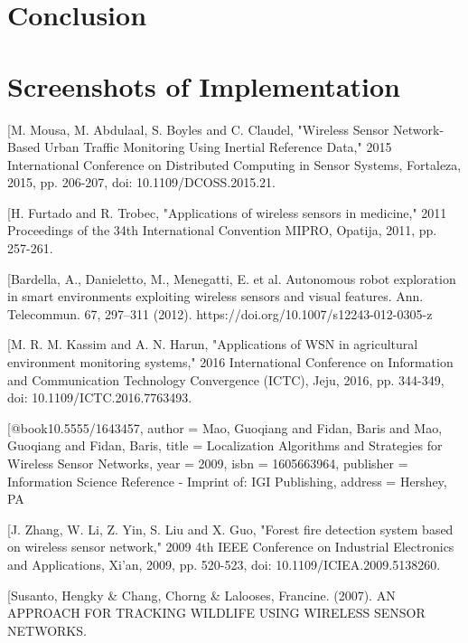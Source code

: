 \documentclass[12pt]{report}
\begin{document}
\chapter{Conclusion}



\appendix
\chapter{Screenshots of Implementation}


\begin{thebibliography}{}

[M. Mousa, M. Abdulaal, S. Boyles and C. Claudel, "Wireless Sensor Network-Based Urban Traffic Monitoring Using Inertial Reference Data," 2015 International Conference on Distributed Computing in Sensor Systems, Fortaleza, 2015, pp. 206-207, doi: 10.1109/DCOSS.2015.21.

[H. Furtado and R. Trobec, "Applications of wireless sensors in medicine," 2011 Proceedings of the 34th International Convention MIPRO, Opatija, 2011, pp. 257-261.

[Bardella, A., Danieletto, M., Menegatti, E. et al. Autonomous robot exploration in smart environments exploiting wireless sensors and visual features. Ann. Telecommun. 67, 297–311 (2012). https://doi.org/10.1007/s12243-012-0305-z

[M. R. M. Kassim and A. N. Harun, "Applications of WSN in agricultural environment monitoring systems," 2016 International Conference on Information and Communication Technology Convergence (ICTC), Jeju, 2016, pp. 344-349, doi: 10.1109/ICTC.2016.7763493.

[@book{10.5555/1643457,
author = {Mao, Guoqiang and Fidan, Baris and Mao, Guoqiang and Fidan, Baris},
title = {Localization Algorithms and Strategies for Wireless Sensor Networks},
year = {2009},
isbn = {1605663964},
publisher = {Information Science Reference - Imprint of: IGI Publishing},
address = {Hershey, PA}
}

[J. Zhang, W. Li, Z. Yin, S. Liu and X. Guo, "Forest fire detection system based on wireless sensor network," 2009 4th IEEE Conference on Industrial Electronics and Applications, Xi'an, 2009, pp. 520-523, doi: 10.1109/ICIEA.2009.5138260.

[Susanto, Hengky \& Chang, Chorng \& Lalooses, Francine. (2007). AN APPROACH FOR TRACKING WILDLIFE USING WIRELESS SENSOR NETWORKS. 


\end{thebibliography}
\end{document}
